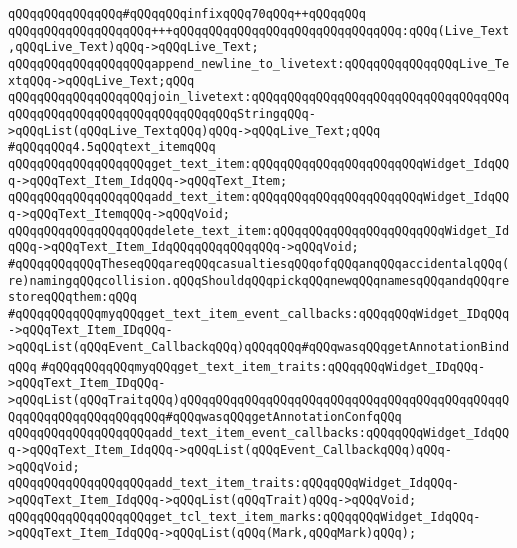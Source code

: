 \verb|qQQqqQQqqQQqqQQq#qQQqqQQqinfixqQQq70qQQq++qQQqqQQq|\newline
\verb|qQQqqQQqqQQqqQQqqQQq+++qQQqqQQqqQQqqQQqqQQqqQQqqQQqqQQq:qQQq(Live_Text,qQQqLive_Text)qQQq->qQQqLive_Text;|\newline
\newline
\verb|qQQqqQQqqQQqqQQqqQQqappend_newline_to_livetext:qQQqqQQqqQQqqQQqLive_TextqQQq->qQQqLive_Text;qQQq|\newline
\verb|qQQqqQQqqQQqqQQqqQQqjoin_livetext:qQQqqQQqqQQqqQQqqQQqqQQqqQQqqQQqqQQqqQQqqQQqqQQqqQQqqQQqqQQqqQQqqQQqStringqQQq->qQQqList(qQQqLive_TextqQQq)qQQq->qQQqLive_Text;qQQq|\newline
\newline
\verb|#qQQqqQQq4.5qQQqtext_itemqQQq|\newline
\verb|qQQqqQQqqQQqqQQqqQQqget_text_item:qQQqqQQqqQQqqQQqqQQqqQQqWidget_IdqQQq->qQQqText_Item_IdqQQq->qQQqText_Item;|\newline
\newline
\verb|qQQqqQQqqQQqqQQqqQQqadd_text_item:qQQqqQQqqQQqqQQqqQQqqQQqWidget_IdqQQq->qQQqText_ItemqQQq->qQQqVoid;|\newline
\verb|qQQqqQQqqQQqqQQqqQQqdelete_text_item:qQQqqQQqqQQqqQQqqQQqqQQqWidget_IdqQQq->qQQqText_Item_IdqQQqqQQqqQQqqQQq->qQQqVoid;|\newline
\newline
\verb|#qQQqqQQqqQQqTheseqQQqareqQQqcasualtiesqQQqofqQQqanqQQqaccidentalqQQq(re)namingqQQqcollision.qQQqShouldqQQqpickqQQqnewqQQqnamesqQQqandqQQqrestoreqQQqthem:qQQq|\newline
\verb|#qQQqqQQqqQQqmyqQQqget_text_item_event_callbacks:qQQqqQQqWidget_IDqQQq->qQQqText_Item_IDqQQq->qQQqList(qQQqEvent_CallbackqQQq)qQQqqQQq#qQQqwasqQQqgetAnnotationBindqQQq|\newline
\verb|#qQQqqQQqqQQqmyqQQqget_text_item_traits:qQQqqQQqWidget_IDqQQq->qQQqText_Item_IDqQQq->qQQqList(qQQqTraitqQQq)qQQqqQQqqQQqqQQqqQQqqQQqqQQqqQQqqQQqqQQqqQQqqQQqqQQqqQQqqQQqqQQqqQQq#qQQqwasqQQqgetAnnotationConfqQQq|\newline
\newline
\verb|qQQqqQQqqQQqqQQqqQQqadd_text_item_event_callbacks:qQQqqQQqWidget_IdqQQq->qQQqText_Item_IdqQQq->qQQqList(qQQqEvent_CallbackqQQq)qQQq->qQQqVoid;|\newline
\verb|qQQqqQQqqQQqqQQqqQQqadd_text_item_traits:qQQqqQQqWidget_IdqQQq->qQQqText_Item_IdqQQq->qQQqList(qQQqTrait)qQQq->qQQqVoid;|\newline
\newline
\verb|qQQqqQQqqQQqqQQqqQQqget_tcl_text_item_marks:qQQqqQQqWidget_IdqQQq->qQQqText_Item_IdqQQq->qQQqList(qQQq(Mark,qQQqMark)qQQq);|\newline
